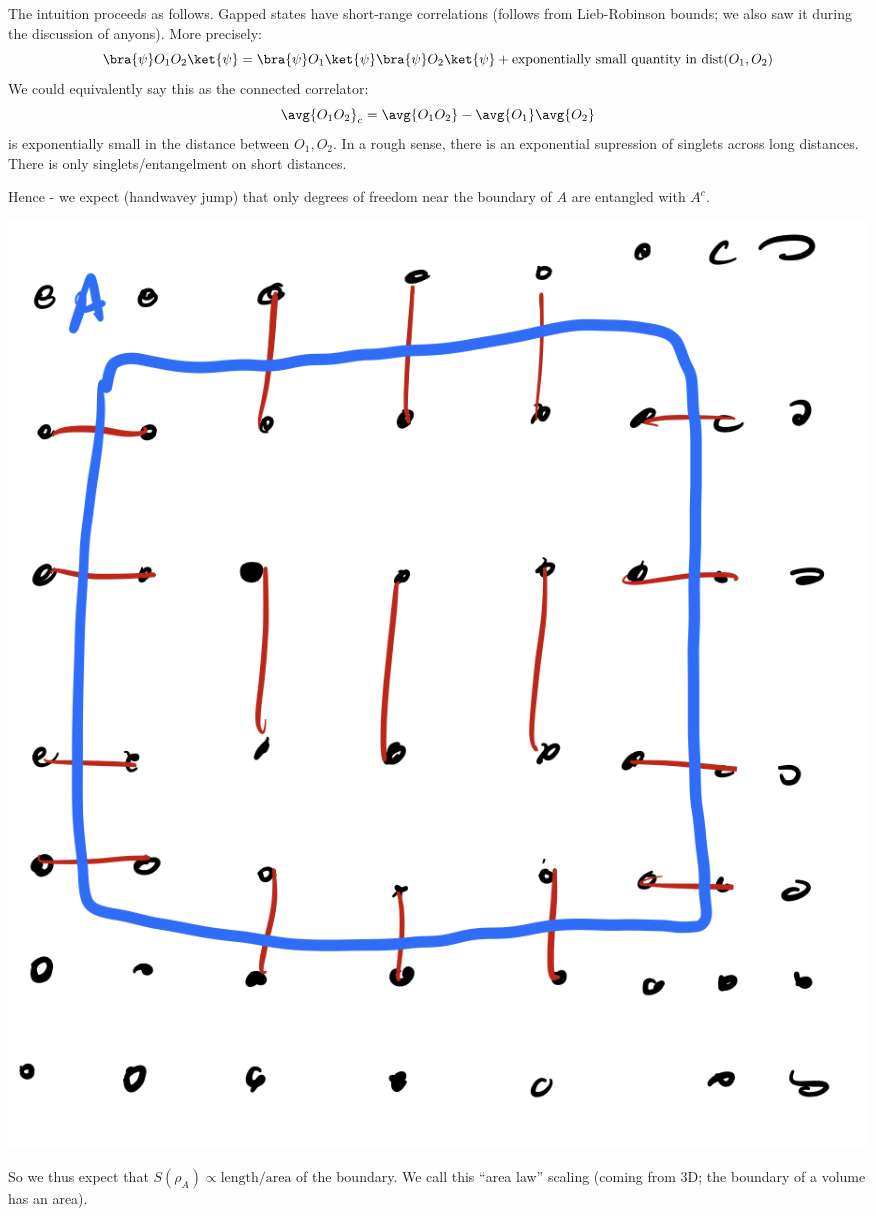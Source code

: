 The intuition proceeds as follows. Gapped states have short-range correlations (follows from Lieb-Robinson bounds; we also saw it during the discussion of anyons). More precisely:
\begin{equation}
    \bra{\psi}O_1O_2\ket{\psi} = \bra{\psi}O_1\ket{\psi}\bra{\psi}O_2\ket{\psi} + \text{exponentially small quantity in $\text{dist}(O_1, O_2)$}
\end{equation}
We could equivalently say this as the connected correlator:
\begin{equation}
    \avg{O_1O_2}_c = \avg{O_1O_2} - \avg{O_1}\avg{O_2}
\end{equation}
is exponentially small in the distance between $O_1, O_2$. In a rough sense, there is an exponential supression of singlets across long distances. There is only singlets/entangelment on short distances.

Hence - we expect (handwavey jump) that only degrees of freedom near the boundary of $A$ are entangled with $A^c$.

\begin{center}
    \includegraphics[scale=0.35]{Lectures/Images/lec16-perimeterlaw.png}
\end{center}

So we thus expect that $S(\rho_A) \propto \text{length/area}$ of the boundary. We call this ``area law'' scaling (coming from 3D; the boundary of a volume has an area).


